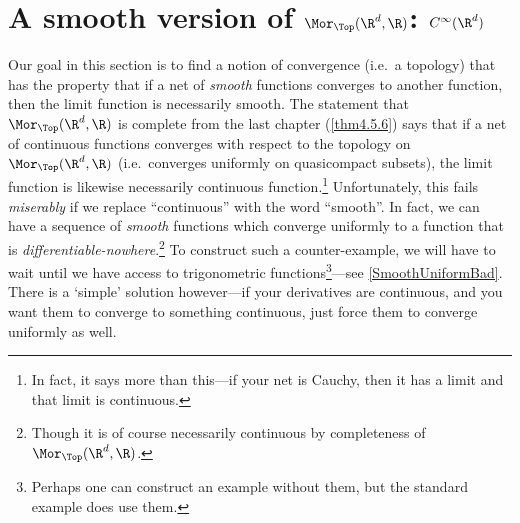\section{A smooth version of \texorpdfstring{$\Mor _{\Top}(\R ^d,\R )$}{Mor Top(Rd,R)}:  \texorpdfstring{$C^{\infty}(\R ^d)$}{Cinfty (Rd)}}

Our goal in this section is to find a notion of convergence (i.e.~a topology) that has the property that if a net of \emph{smooth} functions converges to another  function, then the limit function is necessarily smooth.  The statement that $\Mor _{\Top}(\R ^d,\R )$ is complete from the last chapter (\cref{thm4.5.6}) says that if a net of continuous functions converges with respect to the topology on $\Mor _{\Top}(\R ^d,\R )$ (i.e.~converges uniformly on quasicompact subsets), the limit function is likewise necessarily continuous function.\footnote{In fact, it says more than this---if your net is Cauchy, then it has a limit and that limit is continuous.}  Unfortunately, this fails \emph{miserably} if we replace ``continuous'' with the word ``smooth''.  In fact, we can have a sequence of \emph{smooth} functions which converge uniformly to a function that is \emph{differentiable-nowhere}.\footnote{Though it is of course necessarily continuous by completeness of $\Mor _{\Top}(\R ^d,\R )$.}  To construct such a counter-example, we will have to wait until we have access to trigonometric functions\footnote{Perhaps one can construct an example without them, but the standard example does use them.}---see \cref{SmoothUniformBad}.  There is a `simple' solution however---if your derivatives are continuous, and you want them to converge to something continuous, just force them to converge uniformly as well.

